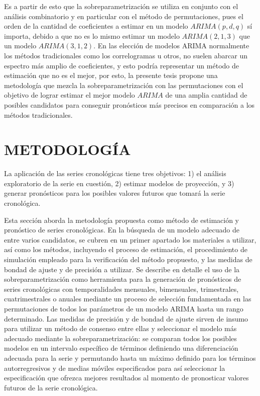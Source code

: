 \documentclass[
]{article}
\begin{document}
Es a partir de esto que la sobreparametrización se utiliza en conjunto
con el análisis combinatorio y en particular con el método de
permutaciones, pues el orden de la cantidad de coeficientes a estimar en
un modelo \(ARIMA(p,d,q)\) sí importa, debido a que no es lo mismo
estimar un modelo \(ARIMA(2,1,3)\) que un modelo \(ARIMA(3,1,2)\). En
las elección de modelos ARIMA normalmente los métodos tradicionales como
los correlogramas u otros, no suelen abarcar un espectro más amplio de
coeficientes, y esto podría representar un método de estimación que no
es el mejor, por esto, la presente tesis propone una metodología que
mezcla la sobreparametrización con las permutaciones con el objetivo de
lograr estimar el mejor modelo \(ARIMA\) de una amplia cantidad de
posibles candidatos para conseguir pronósticos más precisos en
comparación a los métodos tradicionales.

\newpage

\section{METODOLOGÍA}

La aplicación de las series cronológicas tiene tres objetivos: 1) el
análisis exploratorio de la serie en cuestión, 2) estimar modelos de
proyección, y 3) generar pronósticos para los posibles valores futuros
que tomará la serie cronológica.

Esta sección aborda la metodología propuesta como método de estimación y
pronóstico de series cronológicas. En la búsqueda de un modelo adecuado
de entre varios candidatos, se cubren en un primer apartado los
materiales a utilizar, así como los métodos, incluyendo el proceso de
estimación, el procedimiento de simulación empleado para la verificación
del método propuesto, y las medidas de bondad de ajuste y de precisión a
utilizar. Se describe en detalle el uso de la sobreparametrización como
herramienta para la generación de pronósticos de series cronológicas con
temporalidades mensuales, bimensuales, trimestrales, cuatrimestrales o
anuales mediante un proceso de selección fundamentada en las
permutaciones de todos los parámetros de un modelo ARIMA hasta un rango
determinado. Las medidas de precisión y de bondad de ajuste sirven de
insumo para utilizar un método de consenso entre ellas y seleccionar el
modelo más adecuado mediante la sobreparametrización: se comparan todos
los posibles modelos en un intervalo específico de términos definiendo
una diferenciación adecuada para la serie y permutando hasta un máximo
definido para los términos autorregresivos y de medias móviles
especificados para así seleccionar la especificación que ofrezca mejores
resultados al momento de pronosticar valores futuros de la serie
cronológica.
\end{document}
